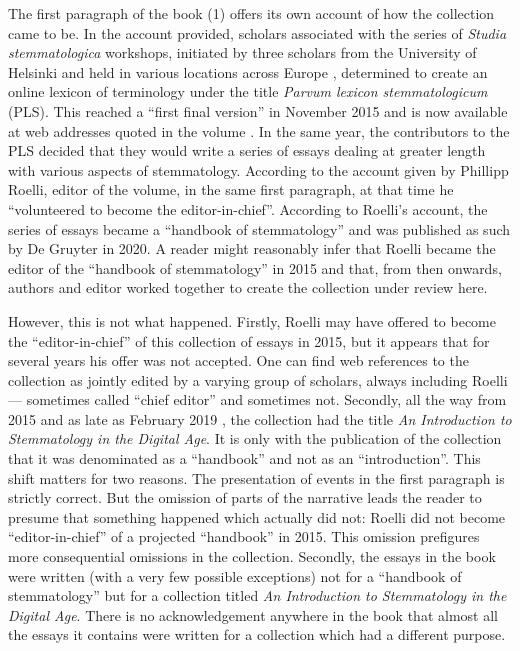 \begin{review}
The first paragraph of the book (1) offers its own account of
how the collection came to be. In the account provided, scholars
associated with the series of \emph{Studia stemmatologica} workshops,
initiated by three scholars from the University of Helsinki and held in
various locations across Europe \parencite{heikkila_studia_2010}, determined to
create an online lexicon of terminology under the title \emph{Parvum
lexicon stemmatologicum} (PLS). This reached a ``first final version''
in November 2015 and is now available at web addresses quoted in the
volume \parencite{roelli_parvum_2015}. In the same year, the contributors to the
PLS decided that they would write a series of essays dealing at greater
length with various aspects of stemmatology. According to the account
given by Phillipp Roelli, editor of the volume, in the same first
paragraph, at that time he ``volunteered to become the
editor-in-chief''. According to Roelli's account, the series of essays
became a ``handbook of stemmatology'' and was published as such by De
Gruyter in 2020. A reader might reasonably infer that Roelli became the
editor of the ``handbook of stemmatology'' in 2015 and that, from then
onwards, authors and editor worked together to create the collection
under review here.

However, this is not what happened. Firstly, Roelli may have
offered to become the ``editor-in-chief'' of this collection of essays
in 2015, but it appears that for several years his offer was not
accepted. One can find web references to the collection as jointly
edited by a varying group of scholars, always including Roelli ––
sometimes called ``chief editor'' and sometimes not. Secondly, all the
way from 2015 and as late as February 2019 \parencite{noauthor_terminology_2019}, the collection had the title \emph{An Introduction to
Stemmatology in the Digital Age}. It is only with the publication of the
collection that it was denominated as a ``handbook'' and not as an
``introduction''. This shift matters for two reasons. The presentation
of events in the first paragraph is strictly correct. But the omission
of parts of the narrative leads the reader to presume that something
happened which actually did not: Roelli did not become
``editor-in-chief'' of a projected ``handbook'' in 2015. This omission
prefigures more consequential omissions in the collection. Secondly, the
essays in the book were written (with a very few possible exceptions)
not for a ``handbook of stemmatology'' but for a collection titled
\emph{An Introduction to Stemmatology in the Digital Age}. There is no
acknowledgement anywhere in the book that almost all the essays it
contains were written for a collection which had a different purpose.


\end{review}
